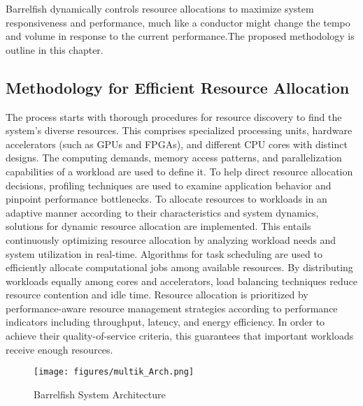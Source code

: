 \documentclass[16pt,a4paper]{article}
\begin{document}
Barrelfish dynamically controls resource allocations to maximize system responsiveness and performance, much like a conductor might change the tempo and volume in response to the current performance.The proposed methodology is outline in this chapter.

\subsection{Methodology for Efficient Resource Allocation}
The process starts with thorough procedures for resource discovery to find the system's diverse resources. This comprises specialized processing units, hardware accelerators (such as GPUs and FPGAs), and different CPU cores with distinct designs. The computing demands, memory access patterns, and parallelization capabilities of a workload are used to define it. To help direct resource allocation decisions, profiling techniques are used to examine application behavior and pinpoint performance bottlenecks. To allocate resources to workloads in an adaptive manner according to their characteristics and system dynamics, solutions for dynamic resource allocation are implemented. This entails continuously optimizing resource allocation by analyzing workload needs and system utilization in real-time. Algorithms for task scheduling are used to efficiently allocate computational jobs among available resources. By distributing workloads equally among cores and accelerators, load balancing techniques reduce resource contention and idle time. Resource allocation is prioritized by performance-aware resource management strategies according to performance indicators including throughput, latency, and energy efficiency. In order to achieve their quality-of-service criteria, this guarantees that important workloads receive enough resources.

\begin{figure}[H]
  \centering
  \texttt{[image: figures/multik\_Arch.png]}  
  \label{fig:3.1.1} 
  \caption{Barrelfish System Architecture}
\end{figure}
\end{document}
